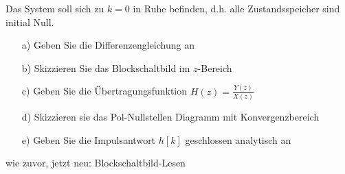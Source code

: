 Das System soll sich zu $k=0$ in Ruhe befinden, d.h. alle Zustandsspeicher
sind initial Null.

\begin{itemize}
\item[a)] Geben Sie die Differenzengleichung an
\item[b)] Skizzieren Sie das Blockschaltbild im $z$-Bereich
\item[c)] Geben Sie die Übertragungsfunktion $H(z)=\frac{Y(z)}{X(z)}$
\item[d)] Skizzieren sie das Pol-Nullstellen Diagramm mit Konvergenzbereich
\item[e)] Geben Sie die Impulsantwort $h[k]$ geschlossen analytisch an
\end{itemize}

\begin{Werkzeug}
wie zuvor, jetzt neu: Blockschaltbild-Lesen
\end{Werkzeug}
